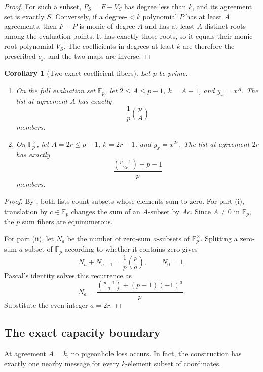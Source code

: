 \documentclass[11pt,letterpaper]{article}
\newtheorem{corollary}[corollary]{Corollary}
\theoremstyle{definition}
\newcommand{\F}{\mathbb{F}}
\begin{document}
\begin{proof}
For such a subset, $P_S=F-V_S$ has degree less than $k$, and its agreement
set is exactly $S$. Conversely, if a degree-$<k$ polynomial $P$ has at
least $A$ agreements, then $F-P$ is monic of degree $A$ and has at
least $A$ distinct roots among the evaluation points. It has exactly those
roots, so it equals their monic root polynomial $V_S$. The coefficients in
degrees at least $k$ are therefore the prescribed $c_j$, and the two
maps are inverse.
\end{proof}

\begin{corollary}[Two exact coefficient fibers]
\label{cor:exact-coefficient-fibers}
Let $p$ be prime.
\begin{enumerate}[label=(\roman*)]
  \item On the full evaluation set $\F_p$, let $2\le A\le p-1$,
        $k=A-1$, and $y_x=x^A$. The list at agreement $A$ has exactly
        \[
          \frac1p\binom pA
        \]
        members.
  \item On $\F_p^\times$, let $A=2r\le p-1$, $k=2r-1$, and
        $y_x=x^{2r}$. The list at agreement $2r$ has exactly
        \[
          \frac{\binom{p-1}{2r}+p-1}{p}
        \]
        members.
\end{enumerate}
\end{corollary}

\begin{proof}
By , both lists count subsets whose elements
sum to zero. For part (i), translation by $c\in\F_p$ changes the sum of an
$A$-subset by $Ac$. Since $A\ne0$ in $\F_p$, the $p$ sum fibers
are equinumerous.

For part (ii), let $N_a$ be the number of zero-sum $a$-subsets of
$\F_p^\times$. Splitting a zero-sum $a$-subset of $\F_p$ according to
whether it contains zero gives
\[
  N_a+N_{a-1}=\frac1p\binom pa,
  \qquad N_0=1.
\]
Pascal's identity solves this recurrence as
\[
  N_a=\frac{\binom{p-1}{a}+(p-1)(-1)^a}{p}.
\]
Substitute the even integer $a=2r$.
\end{proof}

\subsection{The exact capacity boundary}

At agreement \(A=k\), no pigeonhole loss occurs.  In fact, the construction
has exactly one nearby message for every \(k\)-element subset of coordinates.
\end{document}
